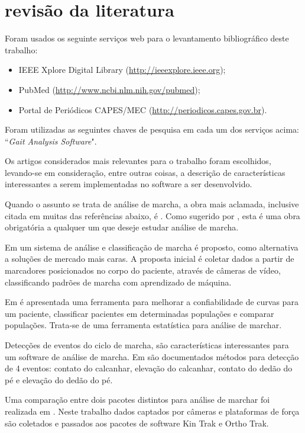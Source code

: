\section[REVISÃO DA LITERATURA]{revisão da literatura}
Foram usados os seguinte serviços web para o levantamento bibliográfico deste trabalho:
\begin{itemize}
	\item IEEE Xplore Digital Library (\href{http://ieeexplore.ieee.org}{http://ieeexplore.ieee.org});
	\item PubMed (\href{http://www.ncbi.nlm.nih.gov/pubmed}{http://www.ncbi.nlm.nih.gov/pubmed});
	\item Portal de Periódicos CAPES/MEC (\href{http://periodicos.capes.gov.br}{http://periodicos.capes.gov.br}).
\end{itemize}

Foram utilizadas as seguintes chaves de pesquisa em cada um dos serviços acima: ``\emph{Gait Analysis Software}".

Os artigos considerados mais relevantes para o trabalho foram escolhidos, levando-se em consideração, entre outras coisas, a descrição de características interessantes a serem implementadas no software a ser desenvolvido.

Quando o assunto se trata de análise de marcha, a obra mais aclamada, inclusive citada em muitas das referências abaixo, é \cite{Perry2010}.
Como sugerido por \cite{Malas}, esta é uma obra obrigatória a qualquer um que deseje estudar análise de marcha.

Em \cite{Vieira2015} um sistema de análise e classificação de marcha é proposto, como alternativa a soluções de mercado mais caras.
A proposta inicial é coletar dados a partir de marcadores posicionados no corpo do paciente, através de câmeras de vídeo, classificando padrões de marcha com aprendizado de máquina.

Em \cite{Duhamel2004} é apresentada uma ferramenta para melhorar a confiabilidade de curvas para um paciente, classificar pacientes em determinadas populações e comparar populações.
Trata-se de uma ferramenta estatística para análise de marchar.

Detecções de eventos do ciclo de marcha, são características interessantes para um software de análise de marcha. 
Em \cite{Ghoussayni2004} são documentados métodos para detecção de 4 eventos: contato do calcanhar, elevação do calcanhar, contato do dedão do pé e elevação do dedão do pé.

Uma comparação entre dois pacotes distintos para análise de marchar foi realizada em \cite{Moraes2003}. Neste trabalho dados captados por câmeras e plataformas de força são coletados e passados aos pacotes de software Kin Trak e Ortho Trak.


